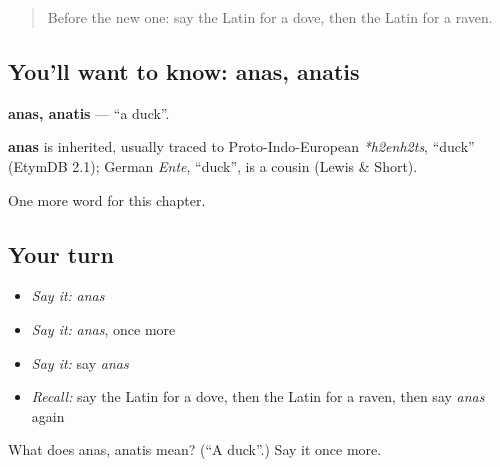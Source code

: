 \label{lesson:LA-C131-anas}



\begin{quote}
Before the new one: say the Latin for a dove, then the Latin for a raven.
\end{quote}

\subsection*{You'll want to know: anas, anatis}
\textbf{anas, anatis} — \textquotedblleft{}a duck\textquotedblright{}.

\begin{cousinweb}
\textbf{anas} is inherited, usually traced to Proto-Indo-European \emph{*h2enh2ts}, \textquotedblleft{}duck\textquotedblright{} (EtymDB 2.1); German \emph{Ente}, \textquotedblleft{}duck\textquotedblright{}, is a cousin (Lewis \& Short).
\end{cousinweb}

\begin{grammarlens}[title={What you've built}]
One more word for this chapter.
\end{grammarlens}

\subsection*{Your turn}
\begin{itemize}
\raggedright
  \item \emph{Say it:} \emph{anas}
  \item \emph{Say it:} \emph{anas}, once more
  \item \emph{Say it:} say \emph{anas}
  \item \emph{Recall:} say the Latin for a dove, then the Latin for a raven, then say \emph{anas} again
\end{itemize}

\begin{tcolorbox}[breakable,colback=teal!4,colframe=teal!35!black,title={Before you move on}]
What does anas, anatis mean? (\textquotedblleft{}A duck\textquotedblright{}.) Say it once more.
\end{tcolorbox}
